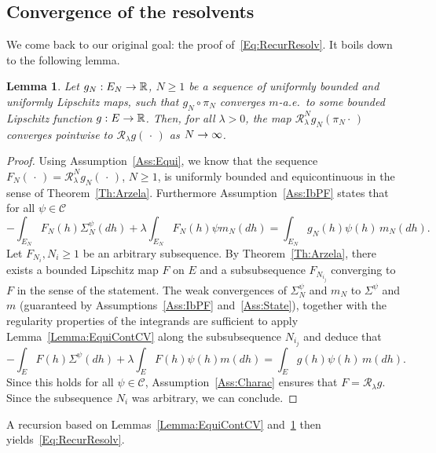 \documentclass[10pt]{amsart}
\newtheorem{lemm}[theo]{Lemma}\newtheorem{prop}[theo]{Proposition}\newtheorem{coro}[theo]{Corollary}\newtheorem{conj}[theo]{Conjecture}
\theoremstyle{definition}\newtheorem{defi}[theo]{Definition}\newtheorem{rema}[theo]{Remark}\newtheorem{exam}[theo]{Example}\newtheorem{exem}[theo]{Example}\newtheorem{nota}[theo]{Notation}
\theoremstyle{plain}
\newcommand{\cC}{\mathcal{C}}
\newcommand{\cR}{\mathcal{R}}
\newcommand{\R}{\mathbb{R}}
\renewcommand*{\to}{\mathchoice{\longrightarrow}{\rightarrow}{\rightarrow}{\rightarrow}}
\begin{document}
\subsection{Convergence of the resolvents}

We come back to our original goal: the proof of~\eqref{Eq:RecurResolv}. It boils down to the following lemma.

\begin{lemm}\label{Lemma:CVResolv}
Let $g_N:E_N\to\R$, $N\geq 1$ be a sequence of uniformly bounded and uniformly Lipschitz maps, such that $g_N\circ \pi_N$ converges $m$-a.e.~to some bounded Lipschitz function $g:E\to\R$. Then, for all $\lambda > 0$, the map $\cR_\lambda^N g_N(\pi_N\cdot\,)$ converges pointwise to $\cR_\lambda g(\,\cdot\,)$ as $N\to\infty$.
\end{lemm}
\begin{proof}
Using Assumption~\ref{Ass:Equi}, we know that the sequence $F_N(\,\cdot\,)=\cR_\lambda^N g_N(\,\cdot\,)$, $N\geq 1$, is uniformly bounded and equicontinuous in the sense of Theorem~\ref{Th:Arzela}. Furthermore Assumption~\ref{Ass:IbPF} states that for all $\psi \in \cC$
\begin{equation*}
-\int_{E_N} F_N(h) \Sigma_N^{\psi}(dh) + \lambda \int_{E_N} F_N(h) \psi m_N(dh) = \int_{E_N} g_N(h) \psi(h)\, m_N(dh).
\end{equation*}
Let $F_{N_i}, N_i\geq 1$ be an arbitrary subsequence. By Theorem~\ref{Th:Arzela}, there exists a bounded Lipschitz map $F$ on $E$ and a subsubsequence $F_{N_{i_j}}$ converging to $F$ in the sense of the statement. The weak convergences of $\Sigma_N^\psi$ and $m_N$ to $\Sigma^\psi$ and $m$ (guaranteed by Assumptions~\ref{Ass:IbPF} and~\ref{Ass:State}), together with the regularity properties of the integrands are sufficient to apply Lemma~\ref{Lemma:EquiContCV} along the subsubsequence $N_{i_j}$ and deduce that
\begin{equation*}
-\int_{E} F(h) \Sigma^{\psi}(dh) + \lambda \int_{E} F(h) \psi(h) m(dh) = \int_{E} g(h) \psi(h)\, m(dh).
\end{equation*}
Since this holds for all $\psi \in \cC$, Assumption~\ref{Ass:Charac} ensures that $F=\cR_\lambda g$. Since the subsequence $N_i$ was arbitrary, we can conclude.
\end{proof}

A recursion based on Lemmas~\ref{Lemma:EquiContCV} and~\ref{Lemma:CVResolv} then yields~\eqref{Eq:RecurResolv}.
\end{document}
